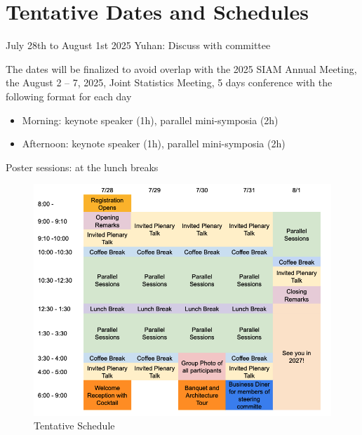 \documentclass{article}
\newcommand{\yuhannote}[1]{{\color{purple}Yuhan: #1}}
\begin{document}
\section{Tentative Dates and Schedules}

July 28th to August 1st 2025
\yuhannote{Discuss with committee}

The dates will be finalized to avoid overlap with the 2025 SIAM Annual Meeting, the August 2 – 7, 2025, Joint Statistics Meeting, 
5 days conference with the following format for each day
\begin{itemize}
    \item  Morning: keynote speaker (1h), parallel mini-symposia (2h)
    \item  Afternoon: keynote speaker (1h), parallel mini-symposia (2h)
\end{itemize}
Poster sessions: at the lunch breaks
\begin{figure}[h]
    \centering
    \includegraphics[width =.95\textwidth]{schedulev2.png}
    \caption{Tentative Schedule}
\end{figure}
\end{document}
